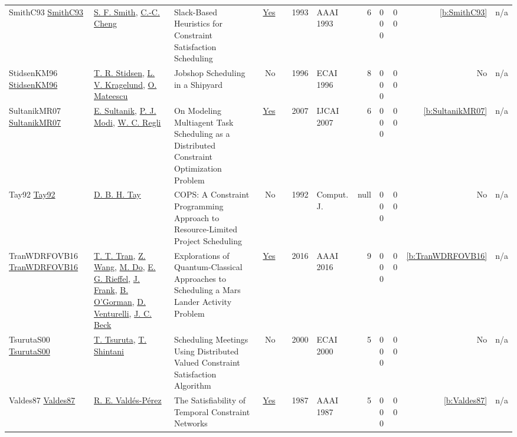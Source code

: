 {\begin{longtable}{>{\raggedright\arraybackslash}p{3cm}>{\raggedright\arraybackslash}p{4.5cm}>{\raggedright\arraybackslash}p{6.0cm}rrrp{2.5cm}rp{1cm}p{1cm}rr}
SmithC93 \href{http://www.aaai.org/Library/AAAI/1993/aaai93-022.php}{SmithC93} & \hyperref[auth:a298]{S. F. Smith}, \hyperref[auth:a1277]{C.-C. Cheng} & Slack-Based Heuristics for Constraint Satisfaction Scheduling & \href{../works/SmithC93.pdf}{Yes} & \cite{SmithC93} & 1993 & AAAI 1993 & 6 & 0 0 0 & 0 0 & \ref{b:SmithC93} & n/a\\
StidsenKM96 \href{}{StidsenKM96} & \hyperref[auth:a1263]{T. R. Stidsen}, \hyperref[auth:a1264]{L. V. Kragelund}, \hyperref[auth:a1265]{O. Mateescu} & Jobshop Scheduling in a Shipyard & No & \cite{StidsenKM96} & 1996 & ECAI 1996 & 8 & 0 0 0 & 0 0 & No & n/a\\
SultanikMR07 \href{http://ijcai.org/Proceedings/07/Papers/247.pdf}{SultanikMR07} & \hyperref[auth:a1443]{E. Sultanik}, \hyperref[auth:a1444]{P. J. Modi}, \hyperref[auth:a1445]{W. C. Regli} & On Modeling Multiagent Task Scheduling as a Distributed Constraint Optimization Problem & \href{../works/SultanikMR07.pdf}{Yes} & \cite{SultanikMR07} & 2007 & IJCAI 2007 & 6 & 0 0 0 & 0 0 & \ref{b:SultanikMR07} & n/a\\
Tay92 \href{}{Tay92} & \hyperref[auth:a701]{D. B. H. Tay} & {COPS:} {A} Constraint Programming Approach to Resource-Limited Project Scheduling & No & \cite{Tay92} & 1992 & Comput. J. & null & 0 0 0 & 0 0 & No & n/a\\
TranWDRFOVB16 \href{http://www.aaai.org/ocs/index.php/WS/AAAIW16/paper/view/12664}{TranWDRFOVB16} & \hyperref[auth:a799]{T. T. Tran}, \hyperref[auth:a808]{Z. Wang}, \hyperref[auth:a809]{M. Do}, \hyperref[auth:a810]{E. G. Rieffel}, \hyperref[auth:a379]{J. Frank}, \hyperref[auth:a811]{B. O'Gorman}, \hyperref[auth:a812]{D. Venturelli}, \hyperref[auth:a89]{J. C. Beck} & Explorations of Quantum-Classical Approaches to Scheduling a Mars Lander Activity Problem & \href{../works/TranWDRFOVB16.pdf}{Yes} & \cite{TranWDRFOVB16} & 2016 & AAAI 2016 & 9 & 0 0 0 & 0 0 & \ref{b:TranWDRFOVB16} & n/a\\
TsurutaS00 \href{}{TsurutaS00} & \hyperref[auth:a1267]{T. Tsuruta}, \hyperref[auth:a1268]{T. Shintani} & Scheduling Meetings Using Distributed Valued Constraint Satisfaction Algorithm & No & \cite{TsurutaS00} & 2000 & ECAI 2000 & 5 & 0 0 0 & 0 0 & No & n/a\\
Valdes87 \href{http://www.aaai.org/Library/AAAI/1987/aaai87-046.php}{Valdes87} & \hyperref[auth:a1273]{R. E. Vald{\'{e}}s-P{\'{e}}rez} & The Satisfiability of Temporal Constraint Networks & \href{../works/Valdes87.pdf}{Yes} & \cite{Valdes87} & 1987 & AAAI 1987 & 5 & 0 0 0 & 0 0 & \ref{b:Valdes87} & n/a\\

\end{longtable}}
